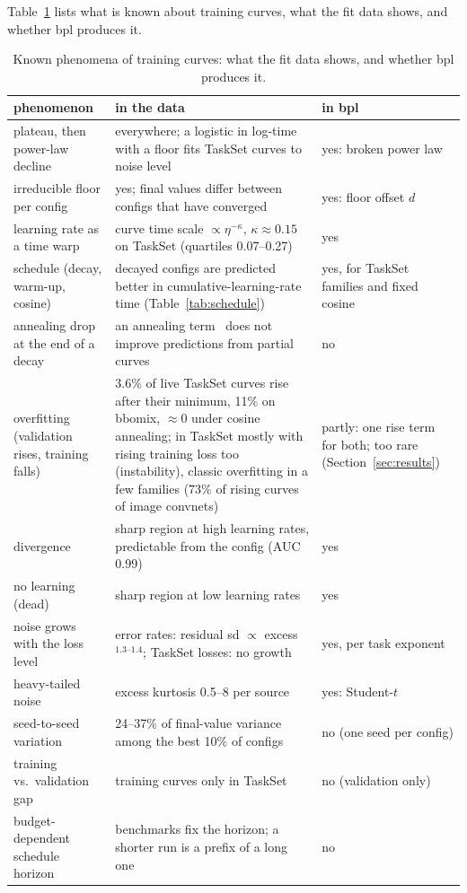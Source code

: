 \documentclass[10pt]{article}
\newcommand{\bpl}{\textsf{bpl}}
\begin{document}
Table~\ref{tab:phenomena} lists what is known about training curves, what the fit data shows, and whether \bpl{}
produces it.

\begin{table}[t]
\centering\small
\caption{Known phenomena of training curves: what the fit data shows, and whether \bpl{} produces it.}
\label{tab:phenomena}
\begin{tabular}{p{3.7cm}p{6.8cm}p{4.0cm}}
\toprule
phenomenon & in the data & in \bpl{} \\
\midrule
plateau, then power-law decline & everywhere; a logistic in log-time with a floor fits TaskSet curves to noise level & yes: broken power law \\
irreducible floor per config & yes; final values differ between configs that have converged & yes: floor offset $d$ \\
learning rate as a time warp & curve time scale $\propto \eta^{-\kappa}$, $\kappa \approx 0.15$ on TaskSet (quartiles 0.07--0.27) & yes \\
schedule (decay, warm-up, cosine) & decayed configs are predicted better in cumulative-learning-rate time (Table~\ref{tab:schedule}) & yes, for TaskSet families and fixed cosine \\
annealing drop at the end of a decay & an annealing term~\cite{tissue2024scaling} does not improve predictions from partial curves & no \\
overfitting (validation rises, training falls) & 3.6\% of live TaskSet curves rise after their minimum, 11\% on bbomix, $\approx 0$ under cosine annealing; in TaskSet mostly with rising training loss too (instability), classic overfitting in a few families (73\% of rising curves of image convnets) & partly: one rise term for both; too rare (Section~\ref{sec:results}) \\
divergence & sharp region at high learning rates, predictable from the config (AUC 0.99) & yes \\
no learning (dead) & sharp region at low learning rates & yes \\
noise grows with the loss level & error rates: residual sd $\propto$ excess$^{1.3\text{--}1.4}$; TaskSet losses: no growth & yes, per task exponent \\
heavy-tailed noise & excess kurtosis 0.5--8 per source & yes: Student-$t$ \\
seed-to-seed variation & 24--37\% of final-value variance among the best 10\% of configs & no (one seed per config) \\
training vs.\ validation gap & training curves only in TaskSet & no (validation only) \\
budget-dependent schedule horizon & benchmarks fix the horizon; a shorter run is a prefix of a long one & no \\
\bottomrule
\end{tabular}
\end{table}
\end{document}
